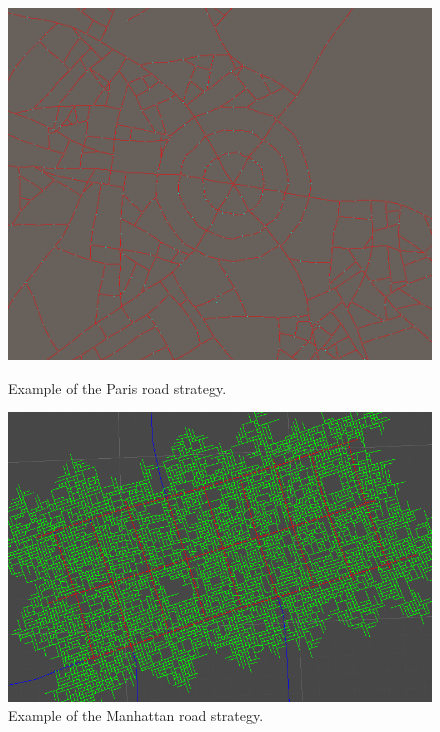 \begin{figure}[H]
  \centering
  \begin{minipage}[b][][b]{.3825\textwidth}
    \centering
    \begin{minipage}[b][][b]{.9\textwidth}
      \centering
      \includegraphics[width=\textwidth]{figure/road_network_paris.png}
      \caption{Example of the Paris road strategy.}
      \label{fig:road_network_paris}
    \end{minipage}
  \end{minipage}
  \begin{minipage}[b][][b]{.5175\textwidth}
    \begin{minipage}[b][][b]{.9\textwidth}
      \centering
      \centering
      \includegraphics[width=\textwidth]{figure/road_network_manhattan.png}
      \caption{Example of the Manhattan road strategy.}
      \label{fig:road_network_manhattan}
    \end{minipage}
  \end{minipage}
\end{figure}


